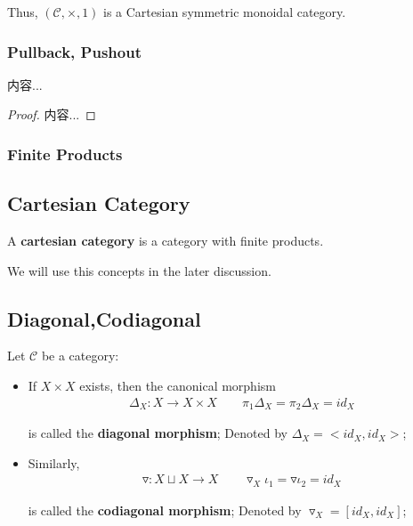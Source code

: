 \documentclass[Total.tex]{subfiles}
\begin{document}
					Thus, $(\mathcal{C},\times,1)$ is a Cartesian symmetric monoidal category.
					
				\subsubsection{Pullback, Pushout}
				
					\begin{proposition}
						内容...
					\end{proposition}
					\begin{proof}
						内容...
					\end{proof}
				\subsubsection{Finite Products}
			\subsection{Cartesian Category}
			\begin{Def}
				A \textbf{cartesian category} is a category with finite products.
			\end{Def}
			
			We will use this concepts in the later discussion. 
			\subsection{Diagonal,Codiagonal}
			\begin{Def} Let $\mathcal{C}$ be a category:
				\begin{itemize}
					\item If $X\times X$ exists, then the canonical morphism
					\begin{gather*}
						\Delta_X:X\rightarrow X\times X\qquad \pi_1 \Delta_X=\pi_2\Delta_X=id_X
					\end{gather*}
					
					is called the \textbf{diagonal morphism}; Denoted by $\Delta_X=<id_X,id_X>$;
					\item Similarly, 
					\begin{gather*}
						\triangledown:X\sqcup X\rightarrow X\qquad \triangledown_X\iota_1=\triangledown \iota_2=id_X
					\end{gather*}
					
					is called the \textbf{codiagonal morphism}; Denoted by $\triangledown_X=[id_X,id_X]$;
				\end{itemize}
			\end{Def}
			
\end{document}
